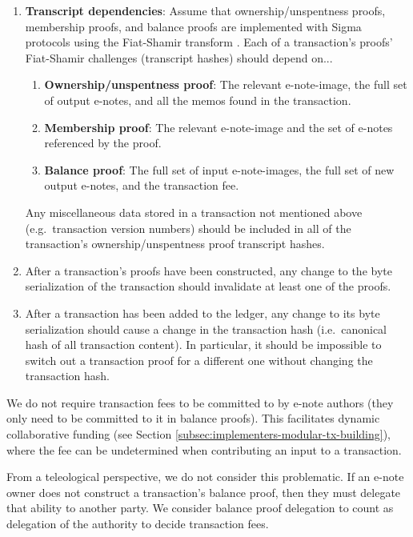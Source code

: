 \begin{enumerate}
    \item \textbf{Transcript dependencies}: Assume that ownership/unspentness proofs, membership proofs, and balance proofs are implemented with Sigma protocols using the Fiat-Shamir transform \cite{fiat-shamir-transform}. Each of a transaction's proofs' Fiat-Shamir challenges (transcript hashes) should depend on...

    \begin{enumerate}
        \item \textbf{Ownership/unspentness proof}: The relevant e-note-image, the full set of output e-notes, and all the memos found in the transaction.
        \item \textbf{Membership proof}: The relevant e-note-image and the set of e-notes referenced by the proof.
        \item \textbf{Balance proof}: The full set of input e-note-images, the full set of new output e-notes, and the transaction fee.
    \end{enumerate}

    Any miscellaneous data stored in a transaction not mentioned above (e.g.\ transaction version numbers) should be included in all of the transaction's ownership/unspentness proof transcript hashes.

    \item After a transaction's proofs have been constructed, any change to the byte serialization of the transaction should invalidate at least one of the proofs.

    \item After a transaction has been added to the ledger, any change to its byte serialization should cause a change in the transaction hash (i.e.\ canonical hash of all transaction content). In particular, it should be impossible to switch out a transaction proof for a different one without changing the transaction hash.
\end{enumerate}

We do not require transaction fees to be committed to by e-note authors (they only need to be committed to it in balance proofs). This facilitates dynamic collaborative funding (see Section \ref{subsec:implementers-modular-tx-building}), where the fee can be undetermined when contributing an input to a transaction.

From a teleological perspective, we do not consider this problematic. If an e-note owner does not construct a transaction's balance proof, then they must delegate that ability to another party. We consider balance proof delegation to count as delegation of the authority to decide transaction fees.



